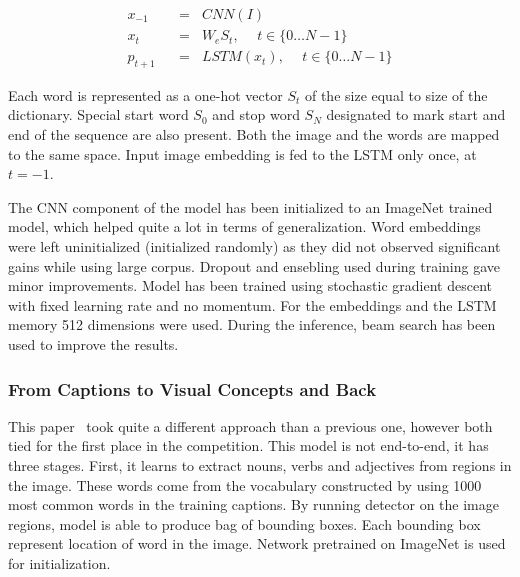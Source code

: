 \belowdisplayskip=24pt
\begin{align}
x_{-1}  \hspace{7pt}&=\hspace{7pt} CNN(I) \label{eq:showmodel1}\\
x_t     \hspace{7pt}&=\hspace{7pt} W_eS_t,\hspace{15pt} t\in\{0\ldots N-1\}  \label{eq:showmodel2}\\
p_{t+1} \hspace{7pt}&=\hspace{7pt} LSTM(x_t),\hspace{15pt} t\in\{0\ldots N-1\}  \label{eq:showmodel3}
\end{align}

Each word is represented as a one-hot vector $ S_t $ of the size equal to size of the dictionary. Special start word $ S_0 $ and stop word $ S_N $ designated to mark start and end of the sequence are also present. Both the image and the words are mapped to the same space. Input image embedding is fed to the LSTM only once, at $ t=-1 $.

The CNN component of the model has been initialized to an ImageNet trained model, which helped quite a lot in terms of generalization. Word embeddings were left uninitialized (initialized randomly) as they did not observed significant gains while using large corpus. Dropout and ensebling used during training gave minor improvements. Model has been trained using stochastic gradient descent with fixed learning rate and no momentum. For the embeddings and the LSTM memory 512 dimensions were used. During the inference, beam search has been used to improve the results.

		\subsubsection{From Captions to Visual Concepts and Back} \label{subsubsec:fromCaptions}

This paper~\cite{DBLP:journals/corr/FangGISDDGHMPZZ14} took quite a different approach than a previous one, however both tied for the first place in the competition. This model is not end-to-end, it has three stages. First, it learns to extract nouns, verbs and adjectives from regions in the image. These words come from the vocabulary constructed by using 1000 most common words in the training captions. By running detector on the image regions, model is able to produce bag of bounding boxes. Each bounding box represent location of word in the image. Network pretrained on ImageNet is used for initialization.

